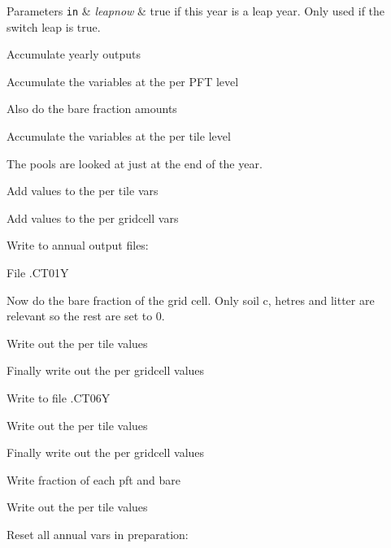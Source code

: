 \begin{DoxyParams}[1]{Parameters}
\mbox{\tt in}  & {\em leapnow} & true if this year is a leap year. Only used if the switch \textquotesingle{}leap\textquotesingle{} is true. \\
\hline
\end{DoxyParams}
Accumulate yearly outputs

Accumulate the variables at the per P\+F\+T level

Also do the bare fraction amounts

Accumulate the variables at the per tile level

The pools are looked at just at the end of the year.

Add values to the per tile vars

Add values to the per gridcell vars

Write to annual output files\+:

File .C\+T01\+Y

Now do the bare fraction of the grid cell. Only soil c, hetres and litter are relevant so the rest are set to 0.

Write out the per tile values

Finally write out the per gridcell values

Write to file .C\+T06\+Y

Write out the per tile values

Finally write out the per gridcell values

Write fraction of each pft and bare

Write out the per tile values

Reset all annual vars in preparation\+: 